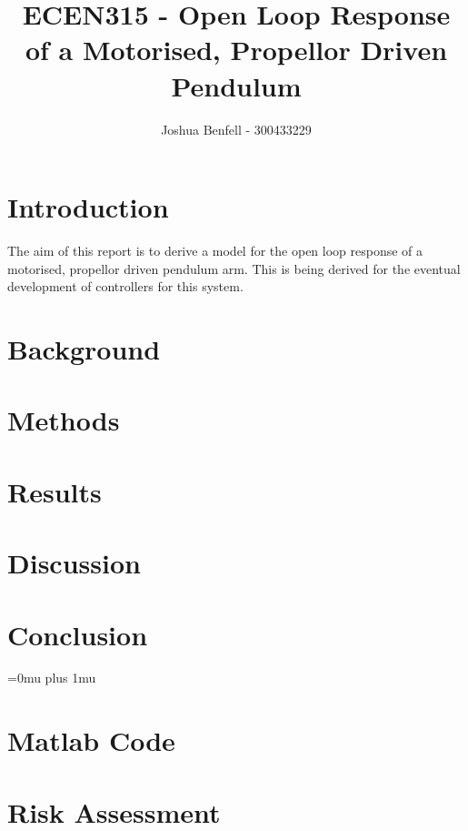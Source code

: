 \documentclass[a4paper, 12pt, compsoc]{IEEEtran}
\title{ECEN315 - Open Loop Response of a Motorised, Propellor Driven Pendulum}
\author{Joshua Benfell - 300433229}
\begin{document}
    \maketitle
    \IEEEdisplaynontitleabstractindextext

    \section{Introduction}\label{sec:intro}
        The aim of this report is to derive a model for the open loop response of a motorised, propellor driven pendulum arm. This is being derived for the eventual development of controllers for this system.

    \section{Background}\label{sec:bg}
    \section{Methods}\label{sec:methods}
    \section{Results}\label{sec:results}
    \section{Discussion}\label{sec:discussion}
    \section{Conclusion}\label{sec:conclusion}


    \Urlmuskip=0mu plus 1mu\relax
    
    
    \pagebreak
    \begin{appendices}
        \section{Matlab Code}
            
            
        \section{Risk Assessment}
    \end{appendices}
\end{document}
